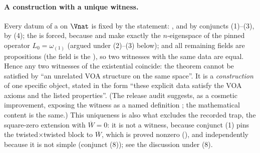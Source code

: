 \paragraph{A construction with a unique witness.}  Every datum of a  on
$\Vnat$ is fixed by the statement: ,  and  by conjuncts
(1)--(3),  by (4); the  is forced, because  and
 make  exactly the $n$-eigenspace of the pinned operator
$L_0=\omega_{(1)}$ (argued under (2)--(3) below); and all remaining fields are propositions (the field
 is the  ), so two witnesses with the same data are
equal.  Hence any two witnesses of the existential coincide: the theorem cannot be satisfied by ``an
unrelated VOA structure on the same space''.  It is a \emph{construction} of one specific object,
stated in the form ``these explicit data satisfy the VOA axioms and the listed properties''.  (The
release audit suggests, as a cosmetic improvement, exposing the witness as a named definition
; the mathematical content is the same.)  This uniqueness is also what
excludes the recorded trap, the square-zero extension with $\overline W=0$: it is not a witness,
because conjunct (1) pins the twisted$\times$twisted block to $\overline W$, which is proved nonzero
(), and independently because it is not simple (conjunct (8)); see the
discussion under (8).


